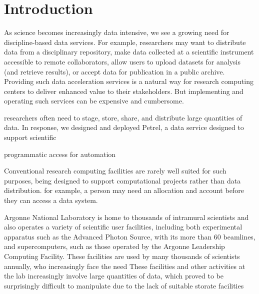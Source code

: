 \documentclass[sigconf]{acmart}
\begin{document}




\maketitle



\section{Introduction}

As science becomes increasingly data intensive, 
we see a growing need for discipline-based data services. 
For example, researchers may want to distribute data from a disciplinary repository, 
make data collected at a scientific instrument accessible to remote collaborators,
 allow users to upload datasets for analysis (and retrieve results), 
 or accept data for publication in a public archive. 
 Providing such data acceleration services is a natural way for research computing centers to deliver enhanced value to their stakeholders. But implementing and operating such services can be expensive and cumbersome. 

researchers often need to stage, store, share, and distribute large quantities of data.
In response, we designed and deployed Petrel, 
a data service designed to support scientific  

programmatic access for automation 

Conventional research computing facilities are rarely well suited for such purposes,
being designed to support computational projects rather than data distribution.
for example, a person may need an allocation and account before
they can access a data system.

Argonne National Laboratory is home to thousands of intramural scientists and also
operates a variety of scientific user facilities,
including both experimental apparatus such as the Advanced Photon Source,
with its more than 60 beamlines, and supercomputers, such as those operated
by the Argonne Leadership Computing Facility.
These facilities are used by many thousands of scientists annually, who increasingly
face the need 
These facilities and other activities at the lab increasingly involve large 
quantities of data, 
which proved to be surprisingly difficult to manipulate due to the lack of suitable storate facilities 
\end{document}

